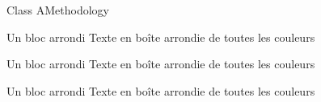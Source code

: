 \begin{frame}{Class A}{Methodology}

	\begin{beamerboxesrounded} [lower=structure, upper=block title, shadow=true] {Un bloc arrondi}
		 Texte en boîte arrondie de toutes les couleurs
	\end{beamerboxesrounded}
	 
	\begin{block} {Un bloc arrondi}
		Texte en boîte arrondie de toutes les couleurs
	\end{block} 
	 
	\vfill
	\begin{beamerboxesrounded}[scheme=clair, shadow=true] {Un bloc arrondi}
		Texte en boîte arrondie de toutes les couleurs
	\end{beamerboxesrounded}
	
\end{frame}
